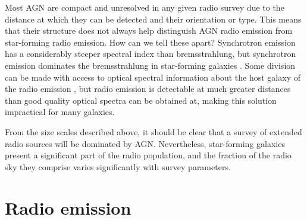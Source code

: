     Most AGN are compact and unresolved in any given radio survey due to the distance at which they can be detected and their orientation or type. This means that their structure does not always help distinguish AGN radio emission from star-forming radio emission. How can we tell these apart? Synchrotron emission has a considerably steeper spectral index than bremsstrahlung, but synchrotron emission dominates the bremsstrahlung in star-forming galaxies \citep{condon_radio_1992}. Some division can be made with access to optical spectral information about the host galaxy of the radio emission \citep[e.g.][]{mauch_radio_2007, groves_distinguishing_2008}, but radio emission is detectable at much greater distances than good quality optical spectra can be obtained at, making this solution impractical for many galaxies. 

    From the size scales described above, it should be clear that a survey of extended radio sources will be dominated by AGN. Nevertheless, star-forming galaxies present a significant part of the radio population, and the fraction of the radio sky they comprise varies significantly with survey parameters.




\section{Radio emission}
\label{sec:radio-astronomy}

